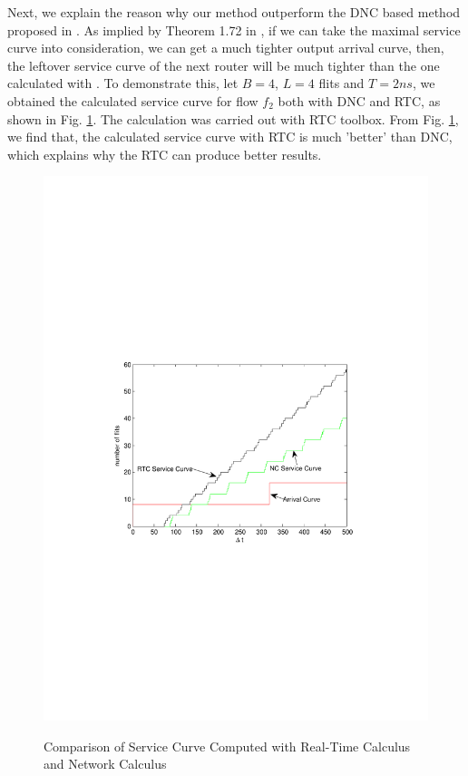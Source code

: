 \documentclass[10pt,journal]{IEEEtran}
\begin{document}
Next, we explain the reason why our method outperform the DNC based method proposed in \cite{Qian489900}. As implied by Theorem 1.72 in \cite{Boudec2001Network}, if we can take the maximal service curve into consideration, we can get a much tighter output arrival curve, then, the leftover service curve of the next router will be much tighter than the one calculated with \cite{qian2009analysis}. To demonstrate this, let $B=4$, $L=4$ flits and $T=2ns$, we obtained the calculated service curve for flow $f_2$ both with DNC and RTC, as shown in Fig. \ref{loose}. The calculation was carried out with RTC toolbox. From Fig. \ref{loose}, we find that, the calculated service curve with RTC is much 'better' than DNC, which explains why the RTC can produce better results.
\begin{figure}
  \centering
  \includegraphics[scale=0.6]{figures/loose.pdf}\\
  \caption{Comparison of Service Curve Computed with Real-Time Calculus and Network Calculus}\label{loose}
\end{figure}
\end{document}

